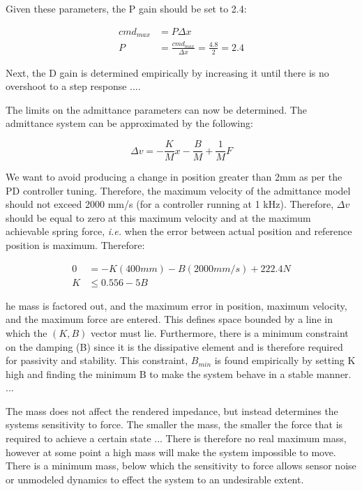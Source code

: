 \documentclass[12pt]{report}
\begin{document}
	Given these parameters, the P gain should be set to 2.4:
	
	\begin{align*}
		cmd_{max} &= P\Delta x \\
		P &= \frac{cmd_{max}}{\Delta x} = \frac{4.8}{2} =  2.4
	\end{align*}
	
	Next, the D gain is determined empirically by increasing it until there is no overshoot to a step response ....
	
	The limits on the admittance parameters can now be determined. The admittance system can be approximated by the following:
	
	\begin{equation}
		\Delta v = - \frac{K}{M}x - \frac{B}{M} + \frac{1}{M}F
	\end{equation}
	
	We want to avoid producing a change in position greater than 2mm as per the PD controller tuning. Therefore, the maximum velocity of the admittance model should not exceed 2000 mm/s (for a controller running at 1 kHz). Therefore, $\Delta v$ should be equal to zero at this maximum velocity and at the maximum achievable spring force, \textit{i.e.} when the error between actual position and reference position is maximum. Therefore:
	
	\begin{align}
		0 &= -K(400mm) - B(2000mm/s) + 222.4N \\
		K &\leq 0.556 - 5B   
	\end{align}
	
	he mass is factored out, and the maximum error in position, maximum velocity, and the maximum force are entered. This defines space bounded by a line in which the $(K,B)$ vector must lie. Furthermore, there is a minimum constraint on the damping (B) since it is the dissipative element and is therefore required for passivity and stability. This constraint, $B_{min}$ is found empirically by setting K high and finding the minimum B to make the system behave in a stable manner. ...

	The mass does not affect the rendered impedance, but instead determines the systems sensitivity to force. The smaller the mass, the smaller the force that is required to achieve a certain state ... There is therefore no real maximum mass, however at some point a high mass will make the system impossible to move. There is a minimum mass, below which the sensitivity to force allows sensor noise or unmodeled dynamics to effect the system to an undesirable extent. 
	
\end{document}
